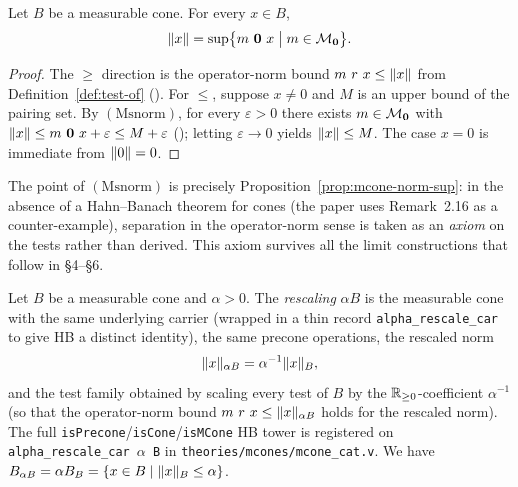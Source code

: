 \begin{proposition}%
  \label{prop:mcone-norm-sup}
  \rocqok
  Let $B$ be a measurable cone. For every $x \in B$,
  \[
    \lVert x \rVert = \sup \bigl\{ m\ \mathbf{0}\ x \bigm| m \in \mathcal{M}_{\mathbf{0}} \bigr\}.
  \]
\end{proposition}
\begin{proof}
  The $\ge$ direction is the operator-norm bound
  $m\ r\ x \le \lVert x \rVert$ from
  Definition~\ref{def:test-of}
  ().
  For $\le$, suppose $x \ne 0$ and $M$ is an upper bound of the
  pairing set. By $(\mathrm{Msnorm})$, for every $\varepsilon > 0$
  there exists $m \in \mathcal{M}_{\mathbf{0}}$ with
  $\lVert x \rVert \le m\ \mathbf{0}\ x + \varepsilon \le M + \varepsilon$
  ();
  letting $\varepsilon \to 0$ yields $\lVert x \rVert \le M$. The case
  $x = 0$ is immediate from $\lVert 0 \rVert = 0$.
\end{proof}

\begin{remark}
  The point of $(\mathrm{Msnorm})$ is precisely
  Proposition~\ref{prop:mcone-norm-sup}: in the absence of a
  Hahn--Banach theorem for cones (the paper uses Remark~2.16 as a
  counter-example), separation in the operator-norm sense is taken
  as an \emph{axiom} on the tests rather than derived. This axiom
  survives all the limit constructions that follow in \S4--\S6.
\end{remark}


\begin{definition}%
  \label{def:alpha-rescale}
  \rocqok
  Let $B$ be a measurable cone and $\alpha > 0$. The \emph{rescaling}
  $\alpha B$ is the measurable cone with the same underlying carrier
  (wrapped in a thin record \texttt{alpha\_rescale\_car} to give HB a
  distinct identity), the same precone operations, the rescaled norm
  \[
    \lVert x \rVert_{\alpha B} = \alpha^{-1} \lVert x \rVert_B,
  \]
  and the test family obtained by scaling every test of $B$ by the
  $\mathbb{R}_{\geq 0}$-coefficient $\alpha^{-1}$ (so that the operator-norm bound
  $m\ r\ x \le \lVert x \rVert_{\alpha B}$ holds for the rescaled norm).
  The full \texttt{isPrecone}/\texttt{isCone}/\texttt{isMCone} HB
  tower is registered on
  \texttt{alpha\_rescale\_car \(\alpha\) B} in
  \texttt{theories/mcones/mcone\_cat.v}.\rocqok
  We have $B_{\alpha B} = \alpha B_B = \{ x \in B \mid \lVert x \rVert_B
  \le \alpha \}$.
\end{definition}

